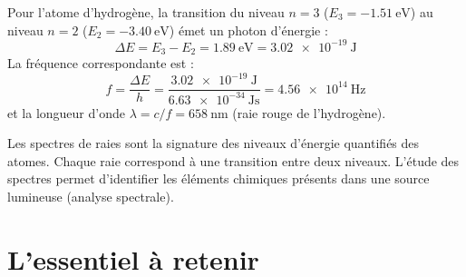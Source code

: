 \begin{illus}
\end{illus}

\begin{exemple}
Pour l'atome d'hydrogène, la transition du niveau \(n=3\) (\(E_3 = \SI{-1.51}{\electronvolt}\)) au niveau \(n=2\) (\(E_2 = \SI{-3.40}{\electronvolt}\)) émet un photon d'énergie :
\[
\Delta E = E_3 - E_2 = \SI{1.89}{\electronvolt} = \SI{3.02e-19}{\joule}
\]
La fréquence correspondante est :
\[
f = \frac{\Delta E}{h} = \frac{\SI{3.02e-19}{\joule}}{\SI{6.63e-34}{\joule\second}} = \SI{4.56e14}{\hertz}
\]
et la longueur d'onde \(\lambda = c/f = \SI{658}{\nano\metre}\) (raie rouge de l'hydrogène).
\end{exemple}

\begin{aretenir}
Les spectres de raies sont la signature des niveaux d'énergie quantifiés des atomes. Chaque raie correspond à une transition entre deux niveaux. L'étude des spectres permet d'identifier les éléments chimiques présents dans une source lumineuse (analyse spectrale).
\end{aretenir}

\section{L'essentiel à retenir}

